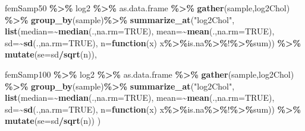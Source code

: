 \documentclass[
  12pt,dutch,coursenotes]{book}
\newenvironment{Shaded}{\begin{snugshade}}{\end{snugshade}}
\newcommand{\ControlFlowTok}[1]{\textcolor[rgb]{0.13,0.29,0.53}{\textbf{#1}}}
\newcommand{\DataTypeTok}[1]{\textcolor[rgb]{0.13,0.29,0.53}{#1}}
\newcommand{\KeywordTok}[1]{\textcolor[rgb]{0.13,0.29,0.53}{\textbf{#1}}}
\newcommand{\NormalTok}[1]{#1}
\newcommand{\OperatorTok}[1]{\textcolor[rgb]{0.81,0.36,0.00}{\textbf{#1}}}
\newcommand{\OtherTok}[1]{\textcolor[rgb]{0.56,0.35,0.01}{#1}}
\newcommand{\StringTok}[1]{\textcolor[rgb]{0.31,0.60,0.02}{#1}}
\theoremstyle{definition}
\theoremstyle{definition}
\theoremstyle{definition}
\theoremstyle{remark}
\begin{document}
\begin{Shaded}
\begin{Highlighting}[]
\NormalTok{  femSamp50 }\OperatorTok{\%\textgreater{}\%}
\StringTok{    }\NormalTok{log2 }\OperatorTok{\%\textgreater{}\%}\StringTok{  }
\StringTok{    }\NormalTok{as.data.frame }\OperatorTok{\%\textgreater{}\%}
\StringTok{    }\KeywordTok{gather}\NormalTok{(sample,log2Chol) }\OperatorTok{\%\textgreater{}\%}
\StringTok{    }\KeywordTok{group\_by}\NormalTok{(sample)}\OperatorTok{\%\textgreater{}\%}
\StringTok{    }\KeywordTok{summarize\_at}\NormalTok{(}\StringTok{"log2Chol"}\NormalTok{,}
               \KeywordTok{list}\NormalTok{(}\DataTypeTok{median=}\OperatorTok{\textasciitilde{}}\KeywordTok{median}\NormalTok{(.,}\DataTypeTok{na.rm=}\OtherTok{TRUE}\NormalTok{),}
                    \DataTypeTok{mean=}\OperatorTok{\textasciitilde{}}\KeywordTok{mean}\NormalTok{(.,}\DataTypeTok{na.rm=}\OtherTok{TRUE}\NormalTok{),}
                    \DataTypeTok{sd=}\OperatorTok{\textasciitilde{}}\KeywordTok{sd}\NormalTok{(.,}\DataTypeTok{na.rm=}\OtherTok{TRUE}\NormalTok{),}
                    \DataTypeTok{n=}\ControlFlowTok{function}\NormalTok{(x) x}\OperatorTok{\%\textgreater{}\%}\NormalTok{is.na}\OperatorTok{\%\textgreater{}\%}\StringTok{\textasciigrave{}}\DataTypeTok{!}\StringTok{\textasciigrave{}}\OperatorTok{\%\textgreater{}\%}\NormalTok{sum)) }\OperatorTok{\%\textgreater{}\%}
\StringTok{    }\KeywordTok{mutate}\NormalTok{(}\DataTypeTok{se=}\NormalTok{sd}\OperatorTok{/}\KeywordTok{sqrt}\NormalTok{(n)),}

\NormalTok{  femSamp100 }\OperatorTok{\%\textgreater{}\%}
\StringTok{    }\NormalTok{log2 }\OperatorTok{\%\textgreater{}\%}
\StringTok{    }\NormalTok{as.data.frame }\OperatorTok{\%\textgreater{}\%}
\StringTok{    }\KeywordTok{gather}\NormalTok{(sample,log2Chol) }\OperatorTok{\%\textgreater{}\%}
\StringTok{    }\KeywordTok{group\_by}\NormalTok{(sample)}\OperatorTok{\%\textgreater{}\%}
\StringTok{    }\KeywordTok{summarize\_at}\NormalTok{(}\StringTok{"log2Chol"}\NormalTok{,}
               \KeywordTok{list}\NormalTok{(}\DataTypeTok{median=}\OperatorTok{\textasciitilde{}}\KeywordTok{median}\NormalTok{(.,}\DataTypeTok{na.rm=}\OtherTok{TRUE}\NormalTok{),}
                    \DataTypeTok{mean=}\OperatorTok{\textasciitilde{}}\KeywordTok{mean}\NormalTok{(.,}\DataTypeTok{na.rm=}\OtherTok{TRUE}\NormalTok{),}
                    \DataTypeTok{sd=}\OperatorTok{\textasciitilde{}}\KeywordTok{sd}\NormalTok{(.,}\DataTypeTok{na.rm=}\OtherTok{TRUE}\NormalTok{),}
                    \DataTypeTok{n=}\ControlFlowTok{function}\NormalTok{(x) x}\OperatorTok{\%\textgreater{}\%}\NormalTok{is.na}\OperatorTok{\%\textgreater{}\%}\StringTok{\textasciigrave{}}\DataTypeTok{!}\StringTok{\textasciigrave{}}\OperatorTok{\%\textgreater{}\%}\NormalTok{sum)) }\OperatorTok{\%\textgreater{}\%}
\StringTok{    }\KeywordTok{mutate}\NormalTok{(}\DataTypeTok{se=}\NormalTok{sd}\OperatorTok{/}\KeywordTok{sqrt}\NormalTok{(n))}
\NormalTok{  )}
\end{Highlighting}
\end{Shaded}
\end{document}
